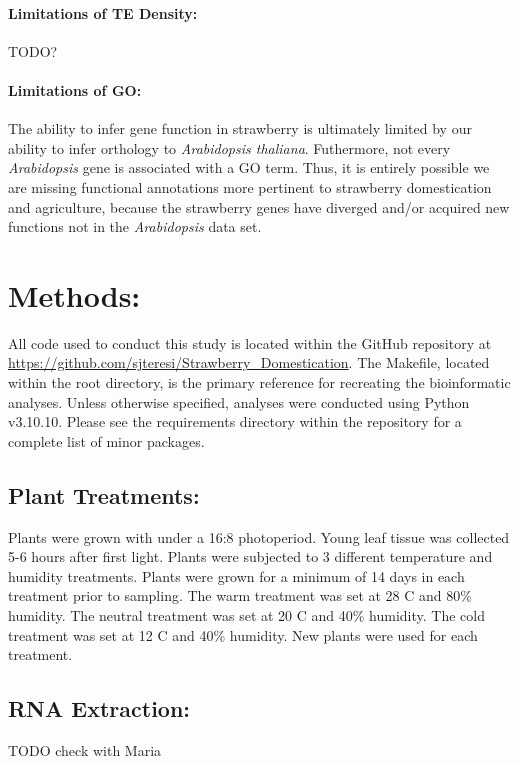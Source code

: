 \documentclass[fleqn,10pt]{olplainarticle}
\begin{document}
\paragraph{Limitations of TE Density:}
TODO?

\paragraph{Limitations of GO:}
The ability to infer gene function in strawberry is ultimately limited by our ability to infer orthology to \textit{Arabidopsis thaliana}.
Futhermore, not every \textit{Arabidopsis} gene is associated with a GO term.
Thus, it is entirely possible we are missing functional annotations more pertinent to strawberry domestication and agriculture, because the strawberry genes have diverged and/or acquired new functions not in the \textit{Arabidopsis} data set.


\section{Methods:} \label{sec:methods}
All code used to conduct this study is located within the GitHub repository at \url{https://github.com/sjteresi/Strawberry_Domestication}.
The Makefile, located within the root directory, is the primary reference for recreating the bioinformatic analyses.
Unless otherwise specified, analyses were conducted using Python v3.10.10.
Please see the requirements directory within the repository for a complete list of minor packages.

\subsection{Plant Treatments:}
Plants were grown with under a 16:8 photoperiod.
Young leaf tissue was collected 5-6 hours after first light.
Plants were subjected to 3 different temperature and humidity treatments.
Plants were grown for a minimum of 14 days in each treatment prior to sampling.
The warm treatment was set at 28 C and 80\% humidity.
The neutral treatment was set at 20 C and 40\% humidity.
The cold treatment was set at 12 C and 40\% humidity.
New plants were used for each treatment.

\subsection{RNA Extraction:}
TODO check with Maria
\end{document}
